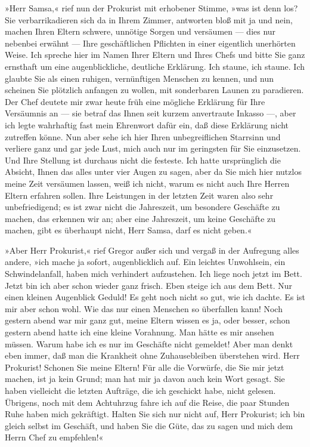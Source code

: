 »Herr Samsa,« rief nun der Prokurist mit erhobener Stimme, »was ist denn
los? Sie verbarrikadieren sich da in Ihrem Zimmer, antworten bloß mit ja
und nein, machen Ihren Eltern schwere, unnötige Sorgen und versäumen ---
dies nur nebenbei erwähnt --- Ihre geschäftlichen Pflichten in einer
eigentlich unerhörten Weise. Ich spreche hier im Namen Ihrer Eltern und
Ihres Chefs und bitte Sie ganz ernsthaft um eine augenblickliche,
deutliche Erklärung. Ich staune, ich staune. Ich glaubte Sie als einen
ruhigen, vernünftigen Menschen zu kennen, und nun scheinen Sie plötzlich
anfangen zu wollen, mit sonderbaren Launen zu paradieren. Der Chef
deutete mir zwar heute früh eine mögliche Erklärung für Ihre Versäumnis
an --- sie betraf das Ihnen seit kurzem anvertraute Inkasso ---, aber ich
legte wahrhaftig fast mein Ehrenwort dafür ein, daß diese Erklärung
nicht zutreffen könne. Nun aber sehe ich hier Ihren unbegreiflichen
Starrsinn und verliere ganz und gar jede Lust, mich auch nur im
geringsten für Sie einzusetzen. Und Ihre Stellung ist durchaus nicht die
festeste. Ich hatte ursprünglich die Absicht, Ihnen das alles unter vier
Augen zu sagen, aber da Sie mich hier nutzlos meine Zeit versäumen
lassen, weiß ich nicht, warum es nicht auch Ihre Herren Eltern erfahren
sollen. Ihre Leistungen in der letzten Zeit waren also sehr
unbefriedigend; es ist zwar nicht die Jahreszeit, um besondere Geschäfte
zu machen, das erkennen wir an; aber eine Jahreszeit, um keine Geschäfte
zu machen, gibt es überhaupt nicht, Herr Samsa, darf es nicht geben.«

»Aber Herr Prokurist,« rief Gregor außer sich und vergaß in der
Aufregung alles andere, »ich mache ja sofort, augenblicklich auf. Ein
leichtes Unwohlsein, ein Schwindelanfall, haben mich verhindert
aufzustehen. Ich liege noch jetzt im Bett. Jetzt bin ich aber schon
wieder ganz frisch. Eben steige ich aus dem Bett. Nur einen kleinen
Augenblick Geduld! Es geht noch nicht so gut, wie ich dachte. Es ist mir
aber schon wohl. Wie das nur einen Menschen so überfallen kann! Noch
gestern abend war mir ganz gut, meine Eltern wissen es ja, oder besser,
schon gestern abend hatte ich eine kleine Vorahnung. Man hätte es mir
ansehen müssen. Warum habe ich es nur im Geschäfte nicht gemeldet! Aber
man denkt eben immer, daß man die Krankheit ohne Zuhausebleiben
überstehen wird. Herr Prokurist! Schonen Sie meine Eltern! Für alle die
Vorwürfe, die Sie mir jetzt machen, ist ja kein Grund; man hat mir ja
davon auch kein Wort gesagt. Sie haben vielleicht die letzten Aufträge,
die ich geschickt habe, nicht gelesen. Übrigens, noch mit dem Achtuhrzug
fahre ich auf die Reise, die paar Stunden Ruhe haben mich gekräftigt.
Halten Sie sich nur nicht auf, Herr Prokurist; ich bin gleich selbst im
Geschäft, und haben Sie die Güte, das zu sagen und mich dem Herrn Chef
zu empfehlen!«

